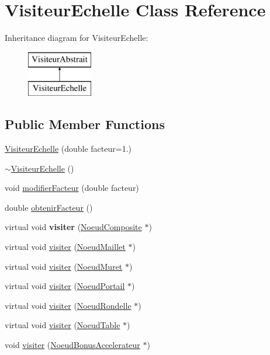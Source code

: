 \hypertarget{class_visiteur_echelle}{}\section{Visiteur\+Echelle Class Reference}
\label{class_visiteur_echelle}
Inheritance diagram for Visiteur\+Echelle\+:\begin{figure}[H]
\begin{center}
\leavevmode
\includegraphics[height=2.000000cm]{class_visiteur_echelle}
\end{center}
\end{figure}
\subsection*{Public Member Functions}
\begin{DoxyCompactItemize}
\item 
\hyperlink{group__inf2990_gaddf0654645ae3598073fb8ec209c62ff}{Visiteur\+Echelle} (double facteur=1.)
\item 
\hyperlink{group__inf2990_gaefd75264dd515e96588720d78698cb43}{$\sim$\+Visiteur\+Echelle} ()
\item 
void \hyperlink{group__inf2990_ga499407dd8991f64b30fc120017ab4090}{modifier\+Facteur} (double facteur)
\item 
double \hyperlink{group__inf2990_gae9b1f432611d822d61c595eaff646009}{obtenir\+Facteur} ()
\item 
virtual void {\bfseries visiter} (\hyperlink{class_noeud_composite}{Noeud\+Composite} $\ast$)
\item 
virtual void \hyperlink{group__inf2990_ga5cde1fb2bc7754fb7f9ce9943deafbc2}{visiter} (\hyperlink{class_noeud_maillet}{Noeud\+Maillet} $\ast$)
\item 
virtual void \hyperlink{group__inf2990_ga66c3727bc8cb483ce19c66a933a1e171}{visiter} (\hyperlink{class_noeud_muret}{Noeud\+Muret} $\ast$)
\item 
virtual void \hyperlink{group__inf2990_gab0abc0f847cb7abda9f002229e88829f}{visiter} (\hyperlink{class_noeud_portail}{Noeud\+Portail} $\ast$)
\item 
virtual void \hyperlink{group__inf2990_gadb69bccd2cfe72d73f860e3a4eabee7d}{visiter} (\hyperlink{class_noeud_rondelle}{Noeud\+Rondelle} $\ast$)
\item 
virtual void \hyperlink{group__inf2990_ga727e8d9127b63b580d4d3297a79332f1}{visiter} (\hyperlink{class_noeud_table}{Noeud\+Table} $\ast$)
\item 
void \hyperlink{group__inf2990_ga397e6d637137fcb2c094190329b2d35b}{visiter} (\hyperlink{class_noeud_bonus_accelerateur}{Noeud\+Bonus\+Accelerateur} $\ast$)
\end{DoxyCompactItemize}

